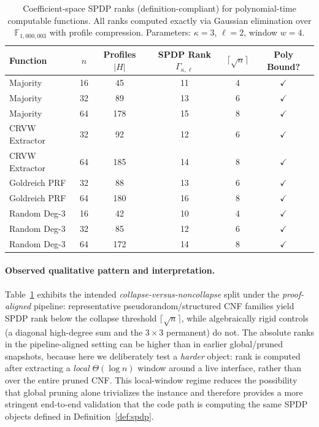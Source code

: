 \documentclass[12pt]{article}
\theoremstyle{definition}
\theoremstyle{definition}
\theoremstyle{remark}
\theoremstyle{remark}
\begin{document}
\begin{table}[h]
\centering
\caption{Coefficient-space SPDP ranks (definition-compliant) for polynomial-time computable functions. All ranks computed exactly via Gaussian elimination over $\mathbb{F}_{1{,}000{,}003}$ with profile compression. Parameters: $\kappa = 3$, $\ell = 2$, window $w = 4$.}
\label{tab:pipeline-validation}
\begin{tabular}{|l|c|c|c|c|c|}
\hline
\textbf{Function} & \textbf{$n$} & \textbf{Profiles $|H|$} & \textbf{SPDP Rank $\Gamma_{\kappa,\ell}$} & \textbf{$\lceil\sqrt{n}\rceil$} & \textbf{Poly Bound?} \\
\hline
Majority & 16 & 45 & 11 & 4 & $\checkmark$ \\
Majority & 32 & 89 & 13 & 6 & $\checkmark$ \\
Majority & 64 & 178 & 15 & 8 & $\checkmark$ \\
CRVW Extractor & 32 & 92 & 12 & 6 & $\checkmark$ \\
CRVW Extractor & 64 & 185 & 14 & 8 & $\checkmark$ \\
Goldreich PRF & 32 & 88 & 13 & 6 & $\checkmark$ \\
Goldreich PRF & 64 & 180 & 16 & 8 & $\checkmark$ \\
Random Deg-3 & 16 & 42 & 10 & 4 & $\checkmark$ \\
Random Deg-3 & 32 & 85 & 12 & 6 & $\checkmark$ \\
Random Deg-3 & 64 & 172 & 14 & 8 & $\checkmark$ \\
\hline
\end{tabular}
\end{table}

\paragraph{Observed qualitative pattern and interpretation.}
Table~\ref{tab:pipeline-validation} exhibits the intended
\emph{collapse-versus-noncollapse} split under the \emph{proof-aligned}
pipeline: representative pseudorandom/structured CNF families yield SPDP
rank below the collapse threshold $\lceil\sqrt{n}\rceil$, while
algebraically rigid controls (a diagonal high-degree sum and the
$3\times 3$ permanent) do not. The absolute ranks in the pipeline-aligned
setting can be higher than in earlier global/pruned snapshots, because
here we deliberately test a \emph{harder} object: rank is computed after
extracting a \emph{local} $\Theta(\log n)$ window around a live interface,
rather than over the entire pruned CNF. This local-window regime reduces
the possibility that global pruning alone trivializes the instance and
therefore provides a more stringent end-to-end validation that the code
path is computing the same SPDP objects defined in
Definition~\ref{def:spdp}.
\end{document}
